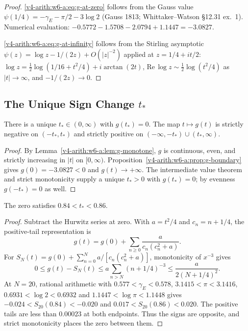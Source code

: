 \begin{proof}
\eqref{v4-arith:w6-a:eq:g-at-zero} follows from the Gauss value
\(\psi(1/4)=-\gamma_{E}-\pi/2-3\log 2\) (Gauss 1813; Whittaker--Watson
\S12.31 ex.~1). Numerical evaluation:
\(-0.5772-1.5708-2.0794+1.1447=-3.0827\).

\eqref{v4-arith:w6-a:eq:g-at-infinity} follows from the Stirling
asymptotic \(\psi(z)=\log z-1/(2z)+O(|z|^{-2})\) applied at
\(z=1/4+it/2\): \(\log z=\tfrac{1}{2}\log(1/16+t^{2}/4)+i\arctan(2t)\),
\(\mathrm{Re}\,\log z\sim\tfrac{1}{2}\log(t^{2}/4)\) as \(|t|\to\infty\),
and \(-1/(2z)\to 0\).
\end{proof}

\subsection{The Unique Sign Change \(t_{\ast}\)}
\label{v4-arith:w6-a:digamma-kernel:sign-change}

\begin{theorem}
\label{v4-arith:w6-a:thm:t-star}
There is a unique \(t_{\ast}\in(0,\infty)\)
with \(g(t_{\ast})=0\). The map \(t\mapsto g(t)\) is strictly negative on
\((-t_{\ast},t_{\ast})\) and strictly positive on
\((-\infty,-t_{\ast})\cup(t_{\ast},\infty)\).
\end{theorem}

\begin{proof}
By Lemma~\ref{v4-arith:w6-a:lem:g-monotone}, \(g\) is continuous, even, and
strictly increasing in \(|t|\) on \([0,\infty)\).
Proposition~\ref{v4-arith:w6-a:prop:g-boundary} gives \(g(0)=-3.0827<0\) and
\(g(t)\to+\infty\). The intermediate value theorem and strict
monotonicity supply a unique \(t_{\ast}>0\) with \(g(t_{\ast})=0\); by
evenness \(g(-t_{\ast})=0\) as well.
\end{proof}

\begin{proposition}
\label{v4-arith:w6-a:prop:t-star-numerical}
The zero satisfies \(0.84<t_*<0.86\).
\end{proposition}
\begin{proof}
Subtract the Hurwitz series at zero. With \(a=t^2/4\) and
\(c_n=n+1/4\), the positive-tail representation is
\[
 g(t)=g(0)+\sum_{n\geq0}\frac{a}{c_n(c_n^2+a)}.
\]
For \(S_N(t)=g(0)+\sum_{n=0}^Na/[c_n(c_n^2+a)]\), monotonicity
of \(x^{-3}\) gives
\[
 0\leq g(t)-S_N(t)
 \leq a\sum_{n>N}(n+1/4)^{-3}
 \leq \frac{a}{2(N+1/4)^2}.
\]
At \(N=20\), rational arithmetic with
\(0.577<\gamma_E<0.578\), \(3.1415<\pi<3.1416\),
\(0.6931<\log2<0.6932\) and \(1.1447<\log\pi<1.1448\)
gives
\(-0.024<S_{20}(0.84)<-0.020\) and
\(0.017<S_{20}(0.86)<0.020\). The positive tails are less than
\(0.00023\) at both endpoints. Thus the signs are opposite,
and strict monotonicity places the zero between them.
\end{proof}

